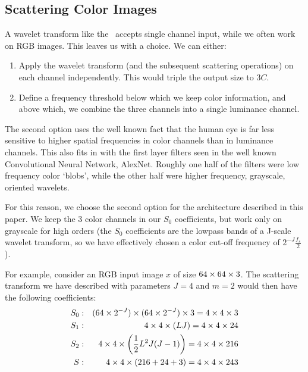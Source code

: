 \subsection{Scattering Color Images}
A wavelet transform like the \DTCWT\ accepts single channel input, while we
often work on RGB images. This leaves us with a choice. We can either:
\begin{enumerate}
  \item Apply the wavelet transform (and the subsequent scattering operations)
    on each channel independently. This would triple the output size to $3C$.
  \item Define a frequency threshold below which we keep color information, and
    above which, we combine the three channels into a single luminance channel.
\end{enumerate}
The second option uses the well known fact that the human eye is far less sensitive 
to higher spatial frequencies in color channels than in luminance channels. 
This also fits in with the first layer filters seen in the well known
Convolutional Neural Network, AlexNet. Roughly one half of the filters were low
frequency color `blobs', while the other half were higher frequency, grayscale,
oriented wavelets. 

For this reason, we choose the second option for the
architecture described in this paper. We keep the 3 color
channels in our $S_0$ coefficients, but work only on grayscale for high orders 
(the $S_0$ coefficients are the lowpass bands of a J-scale wavelet transform, so
we have effectively chosen a color cut-off frequency of $2^{-J} \frac{f_s}{2}$).

For example, consider an RGB input image $x$ of size $64\times 64\times 3$. The 
scattering transform we have described with parameters $J=4$ and $m=2$ would
then have the following coefficients:
\begin{eqnarray*}
  S_0 &:& (64\times 2^{-J}) \times (64\times 2^{-J}) \times 3 = 4\times 4\times 3 \\
  S_1 &:& 4\times 4\times (L J) = 4\times 4\times 24 \\
  S_2 &:& 4\times 4\times \left(\frac{1}{2}L^2 J(J-1)\right) = 4\times 4\times 216 \\
  S &:& 4\times 4\times (216+24+3) = 4\times 4\times 243
\end{eqnarray*}

